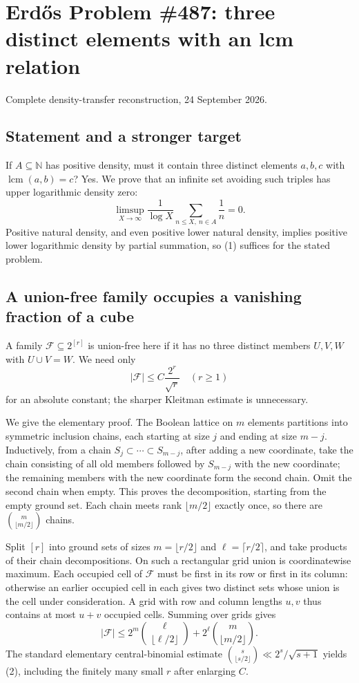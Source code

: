 \section{Erd\H{o}s Problem \#487: three distinct elements with an lcm relation}
\noindent Complete density-transfer reconstruction, 24 September 2026.

\subsection*{Statement and a stronger target}
If $A\subseteq\mathbb N$ has positive density, must it contain three distinct elements $a,b,c$ with $\operatorname{lcm}(a,b)=c$? Yes. We prove that an infinite set avoiding such triples has upper logarithmic density zero:
\[\limsup_{X\to\infty}\frac1{\log X}\sum_{n\le X,\ n\in A}\frac1n=0.\tag{1}\]
Positive natural density, and even positive lower natural density, implies positive lower logarithmic density by partial summation, so (1) suffices for the stated problem.

\subsection*{A union-free family occupies a vanishing fraction of a cube}
A family $\mathcal F\subseteq2^{[r]}$ is union-free here if it has no three distinct members $U,V,W$ with $U\cup V=W$. We need only
\[|\mathcal F|\le C\frac{2^r}{\sqrt r}\quad(r\ge1)\tag{2}\]
for an absolute constant; the sharper Kleitman estimate is unnecessary.

We give the elementary proof. The Boolean lattice on $m$ elements partitions into symmetric inclusion chains, each starting at size $j$ and ending at size $m-j$. Inductively, from a chain $S_j\subset\cdots\subset S_{m-j}$, after adding a new coordinate, take the chain consisting of all old members followed by $S_{m-j}$ with the new coordinate; the remaining members with the new coordinate form the second chain. Omit the second chain when empty. This proves the decomposition, starting from the empty ground set. Each chain meets rank $\lfloor m/2\rfloor$ exactly once, so there are $\binom m{\lfloor m/2\rfloor}$ chains.

Split $[r]$ into ground sets of sizes $m=\lfloor r/2\rfloor$ and $\ell=\lceil r/2\rceil$, and take products of their chain decompositions. On such a rectangular grid union is coordinatewise maximum. Each occupied cell of $\mathcal F$ must be first in its row or first in its column: otherwise an earlier occupied cell in each gives two distinct sets whose union is the cell under consideration. A grid with row and column lengths $u,v$ thus contains at most $u+v$ occupied cells. Summing over grids gives
\[|\mathcal F|\le2^m\binom\ell{\lfloor\ell/2\rfloor}
+2^\ell\binom m{\lfloor m/2\rfloor}.
\]
The standard elementary central-binomial estimate $\binom s{\lfloor s/2\rfloor}\ll2^s/\sqrt{s+1}$ yields (2), including the finitely many small $r$ after enlarging $C$.

